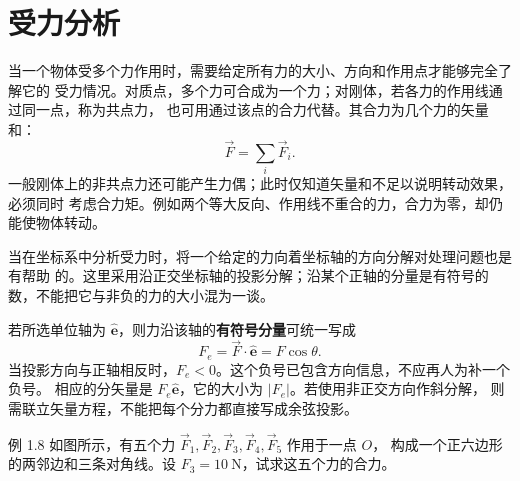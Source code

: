 \documentclass[UTF8,zihao=-4,oneside,openany]{ctexbook}
\begin{document}
\setcounter{page}{1}
\setcounter{chapter}{1}
\setcounter{section}{1}

\section{受力分析}
\setcounter{equation}{7}

当一个物体受多个力作用时，需要给定所有力的大小、方向和作用点才能够完全了解它的
受力情况。对质点，多个力可合成为一个力；对刚体，若各力的作用线通过同一点，称为共点力，
也可用通过该点的合力代替。其合力为几个力的矢量和：
\begin{equation}
  \vec{F}=\sum_i\vec{F}_i.
\end{equation}
一般刚体上的非共点力还可能产生力偶；此时仅知道矢量和不足以说明转动效果，必须同时
考虑合力矩。例如两个等大反向、作用线不重合的力，合力为零，却仍能使物体转动。

当在坐标系中分析受力时，将一个给定的力向着坐标轴的方向分解对处理问题也是有帮助
的。这里采用沿正交坐标轴的投影分解；沿某个正轴的分量是有符号的数，不能把它与非负的力的大小混为一谈。

若所选单位轴为 $\hat{\boldsymbol e}$，则力沿该轴的\textbf{有符号分量}可统一写成
\[
  F_e=\vec F\cdot\hat{\boldsymbol e}=F\cos\theta.
\]
当投影方向与正轴相反时，$F_e<0$。这个负号已包含方向信息，不应再人为补一个负号。
相应的分矢量是 $F_e\hat{\boldsymbol e}$，它的大小为 $|F_e|$。若使用非正交方向作斜分解，
则需联立矢量方程，不能把每个分力都直接写成余弦投影。

\begin{origexamplebox}{例 1.8}
如图所示，有五个力 $\vec{F}_1,\vec{F}_2,\vec{F}_3,\vec{F}_4,\vec{F}_5$ 作用于一点 $O$，
构成一个正六边形的两邻边和三条对角线。设 $F_3=\SI{10}{\newton}$，试求这五个力的合力。

\begin{center}
\end{center}
\end{origexamplebox}
\end{document}
